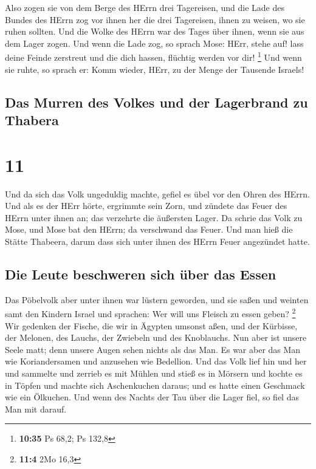  Also zogen sie von dem Berge des HErrn drei Tagereisen,
und die Lade des Bundes des HErrn zog vor ihnen her die drei Tagereisen,
ihnen zu weisen, wo sie ruhen sollten.  Und die Wolke des
HErrn war des Tages über ihnen, wenn sie aus dem Lager zogen.
 Und wenn die Lade zog, so sprach Mose: HErr, stehe auf!
lass deine Feinde zerstreut und die dich hassen, flüchtig werden vor
dir! \footnote{\textbf{10:35} Ps 68,2; Ps 132,8}  Und
wenn sie ruhte, so sprach er: Komm wieder, HErr, zu der Menge der
Tausende Israels!

\hypertarget{das-murren-des-volkes-und-der-lagerbrand-zu-thabera}{%
\subsection{Das Murren des Volkes und der Lagerbrand zu
Thabera}\label{das-murren-des-volkes-und-der-lagerbrand-zu-thabera}}

\hypertarget{section-10}{%
\section{11}\label{section-10}}

 Und da sich das Volk ungeduldig machte, gefiel es übel
vor den Ohren des HErrn. Und als es der HErr hörte, ergrimmte sein Zorn,
und zündete das Feuer des HErrn unter ihnen an; das verzehrte die
äußersten Lager.  Da schrie das Volk zu Mose, und Mose bat
den HErrn; da verschwand das Feuer.  Und man hieß die
Stätte Thabeera, darum dass sich unter ihnen des HErrn Feuer angezündet
hatte.

\hypertarget{die-leute-beschweren-sich-uxfcber-das-essen}{%
\subsection{Die Leute beschweren sich über das
Essen}\label{die-leute-beschweren-sich-uxfcber-das-essen}}

 Das Pöbelvolk aber unter ihnen war lüstern geworden, und
sie saßen und weinten samt den Kindern Israel und sprachen: Wer will uns
Fleisch zu essen geben? \footnote{\textbf{11:4} 2Mo 16,3} 
Wir gedenken der Fische, die wir in Ägypten umsonst aßen, und der
Kürbisse, der Melonen, des Lauchs, der Zwiebeln und des Knoblauchs.
 Nun aber ist unsere Seele matt; denn unsere Augen sehen
nichts als das Man.  Es war aber das Man wie
Koriandersamen und anzusehen wie Bedellion.  Und das Volk
lief hin und her und sammelte und zerrieb es mit Mühlen und stieß es in
Mörsern und kochte es in Töpfen und machte sich Aschenkuchen daraus; und
es hatte einen Geschmack wie ein Ölkuchen.  Und wenn des
Nachts der Tau über die Lager fiel, so fiel das Man mit darauf.

